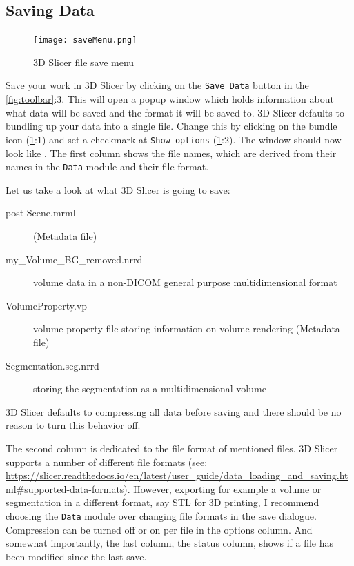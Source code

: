 \subsection{Saving Data}
\begin{figure}[h!]
	\centerline{
		\texttt{[image: saveMenu.png]}}
	\caption{3D Slicer file save menu}\label{fig:save}
\end{figure}
Save your work in 3D Slicer by clicking on the \texttt{Save Data} button in the \cref{fig:toolbar}:3.
This will open a popup window which holds information about what data will be saved and the format it will be saved to.
3D Slicer defaults to bundling up your data into a single file. Change this by clicking on the bundle icon (\cref{fig:save}:1) and set a checkmark at \texttt{Show options} (\cref{fig:save}:2).
The window should now look like .
The first column shows the file names, which are derived from their names in the \texttt{Data} module and their file format.

Let us take a look at what 3D Slicer is going to save:

\begin{description}
	\item [post-Scene.mrml] \cite{kikinis3DSlicerPlatform2014} (Metadata file)
	\item [my\_Volume\_BG\_removed.nrrd] volume data in a non-DICOM general purpose multidimensional format
	\item [VolumeProperty.vp] volume property file storing information on volume rendering (Metadata file)
	\item [Segmentation.seg.nrrd] \cite{kikinis3DSlicerPlatform2014} storing the segmentation as a multidimensional volume
\end{description}

3D Slicer defaults to compressing all data before saving and there should be no reason to turn this behavior off.


The second column is dedicated to the file format of mentioned files.
3D Slicer supports a number of different file formats (see: \url{https://slicer.readthedocs.io/en/latest/user_guide/data_loading_and_saving.html#supported-data-formats}).
However, exporting for example a volume or segmentation in a different format, say STL for 3D printing, I recommend choosing the \texttt{Data} module over changing file formats in the save dialogue.
Compression can be turned off or on per file in the options column.
And somewhat importantly, the last column, the status column, shows if a file has been modified since the last save.

